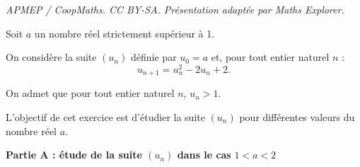 \documentclass[10pt]{article}
\begin{document}
\noindent\textit{APMEP / CoopMaths. CC BY-SA. Présentation adaptée par Maths Explorer.}\par\medskip
\medskip

Soit $a$ un nombre réel strictement supérieur à 1.

On considère la suite $\left(u_n\right)$ définie par $u_0 = a$ et, pour tout entier naturel $n$ : \[u_{n+1} = u_n^2 - 2u_n + 2.\]

On admet que pour tout entier naturel $n$,\: $u_n > 1$.

L'objectif de cet exercice est d'étudier la suite $\left(u_n\right)$ pour différentes valeurs du nombre réel $a$.

\bigskip

\textbf{Partie A : étude de la suite \boldmath $\left(u_n\right)$ \unboldmath dans le cas }\boldmath$1 < a < 2$\unboldmath 

\medskip
\end{document}

